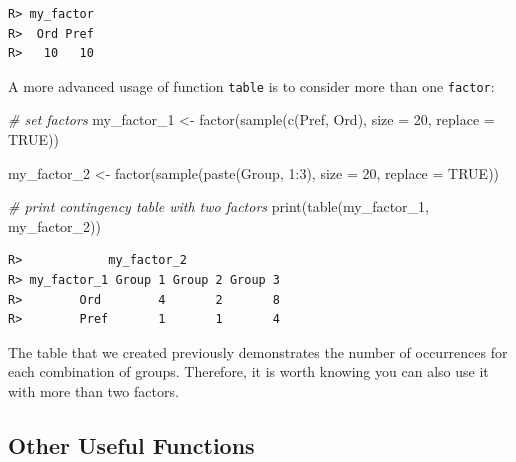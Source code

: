 \documentclass[
  12pt,
]{book}
\newenvironment{Shaded}{\begin{snugshade}}{\end{snugshade}}
\newcommand{\AttributeTok}[1]{\textcolor[rgb]{0.61,0.61,0.61}{#1}}
\newcommand{\CommentTok}[1]{\textcolor[rgb]{0.37,0.37,0.37}{\textit{#1}}}
\newcommand{\ConstantTok}[1]{\textcolor[rgb]{0,0,0}{#1}}
\newcommand{\DecValTok}[1]{\textcolor[rgb]{0.06,0.06,0.06}{#1}}
\newcommand{\FunctionTok}[1]{\textcolor[rgb]{0,0,0}{#1}}
\newcommand{\NormalTok}[1]{#1}
\newcommand{\OtherTok}[1]{\textcolor[rgb]{0.37,0.37,0.37}{#1}}
\newcommand{\SpecialCharTok}[1]{\textcolor[rgb]{0,0,0}{#1}}
\newcommand{\StringTok}[1]{\textcolor[rgb]{0.5,0.5,0.5}{#1}}
\begin{document}
\begin{verbatim}
R> my_factor
R>  Ord Pref 
R>   10   10
\end{verbatim}

A more advanced usage of function \texttt{table} is to consider more than one \texttt{factor}:

\begin{Shaded}
\begin{Highlighting}[]
\CommentTok{\# set factors}
\NormalTok{my\_factor\_1 }\OtherTok{\textless{}{-}} \FunctionTok{factor}\NormalTok{(}\FunctionTok{sample}\NormalTok{(}\FunctionTok{c}\NormalTok{(}\StringTok{\textquotesingle{}Pref\textquotesingle{}}\NormalTok{, }\StringTok{\textquotesingle{}Ord\textquotesingle{}}\NormalTok{),}
                             \AttributeTok{size =} \DecValTok{20}\NormalTok{,}
                             \AttributeTok{replace =} \ConstantTok{TRUE}\NormalTok{))}

\NormalTok{my\_factor\_2 }\OtherTok{\textless{}{-}} \FunctionTok{factor}\NormalTok{(}\FunctionTok{sample}\NormalTok{(}\FunctionTok{paste}\NormalTok{(}\StringTok{\textquotesingle{}Group\textquotesingle{}}\NormalTok{, }\DecValTok{1}\SpecialCharTok{:}\DecValTok{3}\NormalTok{),}
                             \AttributeTok{size =} \DecValTok{20}\NormalTok{,}
                             \AttributeTok{replace =} \ConstantTok{TRUE}\NormalTok{))}

\CommentTok{\# print contingency table with two factors}
\FunctionTok{print}\NormalTok{(}\FunctionTok{table}\NormalTok{(my\_factor\_1, }
\NormalTok{            my\_factor\_2))}
\end{Highlighting}
\end{Shaded}

\begin{verbatim}
R>            my_factor_2
R> my_factor_1 Group 1 Group 2 Group 3
R>        Ord        4       2       8
R>        Pref       1       1       4
\end{verbatim}

The table that we created previously demonstrates the number of occurrences for each combination of groups. Therefore, it is worth knowing you can also use it with more than two factors.

\hypertarget{other-useful-functions-4}{%
\subsection{Other Useful Functions}\label{other-useful-functions-4}}
\end{document}
